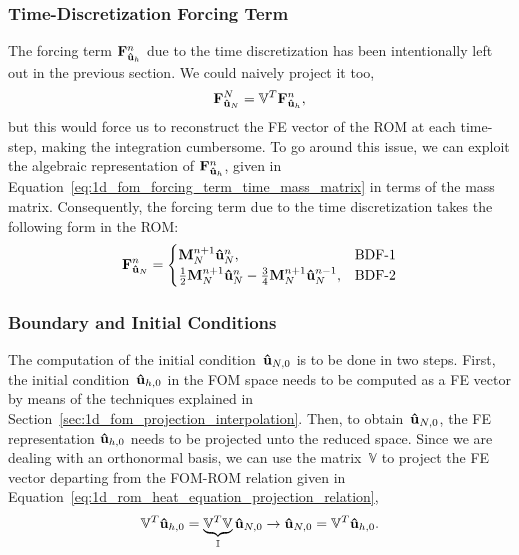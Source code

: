 \documentclass[../1_heat_equation.tex]{subfiles}
\newcommand{\rbV}{\ensuremath{\mathbb{V}}}
\newcommand{\rbVT}{\ensuremath{\rbV^T}}
\begin{document}
\subsubsection*{Time-Discretization Forcing Term}
The forcing term $\vb{F}_{\vb{\hat{u}}_h}^{n}$ due to the time discretization has been intentionally left out in the previous section.
We could naively project it too, 
\begin{equation}
    \vb{F}_{\vb{\hat{u}}_N}^{N} = \rbVT \vb{F}_{\vb{\hat{u}}_h}^{n},
\end{equation}
but this would force us to reconstruct the FE vector of the ROM at each time-step, making the integration cumbersome.
To go around this issue, we can exploit the algebraic representation of $\vb{F}_{\vb{\hat{u}}_h}^{n}$, given in Equation~\eqref{eq:1d_fom_forcing_term_time_mass_matrix} in terms of the mass matrix. 
Consequently, the forcing term due to the time discretization takes the following form in the ROM:
\begin{equation}
    \vb{F}_{\vb{\hat{u}}_N}^{n} = 
    \begin{cases}
        \vb{M}_{N}^{n+1} \vb{\hat{u}}_{N}^{n}, &\text{BDF-1} \\
        \frac{1}{2}\vb{M}_{N}^{n+1} \vb{\hat{u}}_{N}^{n}
        - \frac{3}{4}\vb{M}_{N}^{n+1} \vb{\hat{u}}_{N}^{n-1}, &\text{BDF-2}
    \end{cases}
\end{equation}

\subsubsection{Boundary and Initial Conditions}
The computation of the initial condition~$\vb{\hat{u}}_{N,0}$ is to be done in two steps. 
First, the initial condition~$\vb{\hat{u}}_{h,0}$ in the FOM space needs to be computed as a FE vector by means of the techniques explained in Section~\ref{sec:1d_fom_projection_interpolation}.
Then, to obtain~$\vb{\hat{u}}_{N,0}$, the FE representation $\vb{\hat{u}}_{h,0}$ needs to be projected unto the reduced space. 
Since we are dealing with an orthonormal basis, we can use the matrix~$\rbV$ to project the FE vector departing from the \mbox{FOM-ROM} relation given in Equation~\eqref{eq:1d_rom_heat_equation_projection_relation},
\begin{equation}
    \rbVT \vb{\hat{u}}_{h,0} = \underbrace{\rbVT \rbV}_{\mathbb{I}} \vb{\hat{u}}_{N,0} 
    \rightarrow 
    \vb{\hat{u}}_{N,0} = \rbVT \vb{\hat{u}}_{h,0}.
\end{equation}
\end{document}
